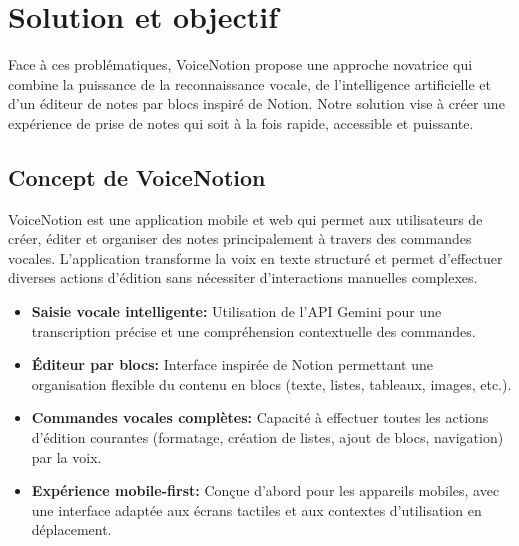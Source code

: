 \section{Solution et objectif}

Face à ces problématiques, VoiceNotion propose une approche novatrice qui combine la puissance de la reconnaissance vocale, de l'intelligence artificielle et d'un éditeur de notes par blocs inspiré de Notion. Notre solution vise à créer une expérience de prise de notes qui soit à la fois rapide, accessible et puissante.

\subsection{Concept de VoiceNotion}

VoiceNotion est une application mobile et web qui permet aux utilisateurs de créer, éditer et organiser des notes principalement à travers des commandes vocales. L'application transforme la voix en texte structuré et permet d'effectuer diverses actions d'édition sans nécessiter d'interactions manuelles complexes.

\begin{itemize}
    \item \textbf{Saisie vocale intelligente:} Utilisation de l'API Gemini pour une transcription précise et une compréhension contextuelle des commandes.
    
    \item \textbf{Éditeur par blocs:} Interface inspirée de Notion permettant une organisation flexible du contenu en blocs (texte, listes, tableaux, images, etc.).
    
    \item \textbf{Commandes vocales complètes:} Capacité à effectuer toutes les actions d'édition courantes (formatage, création de listes, ajout de blocs, navigation) par la voix.
    
    \item \textbf{Expérience mobile-first:} Conçue d'abord pour les appareils mobiles, avec une interface adaptée aux écrans tactiles et aux contextes d'utilisation en déplacement.
\end{itemize}


